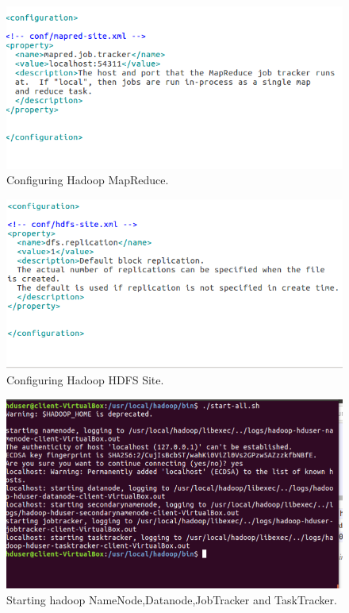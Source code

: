 \documentclass[a4paper,10pt]{article}
\begin{document}
	\begin{figure}[h]
		\includegraphics[scale=0.30,center]{exptTwoScreenShot/fig8.png}
		\caption{Configuring Hadoop MapReduce.}
		\label{fig:8}
	\end{figure}
	
	\begin{figure}[h]
		\includegraphics[scale=0.30,center]{exptTwoScreenShot/fig9.png}
		\caption{Configuring Hadoop HDFS Site.}
		\label{fig:9}
	\end{figure}

 \pagebreak

\begin{figure}[h]
	\includegraphics[scale=0.35,center]{exptTwoScreenShot/startall.png}
	\caption{Starting hadoop NameNode,Datanode,JobTracker and TaskTracker.}
	\label{fig:11}
\end{figure}
\end{document}
